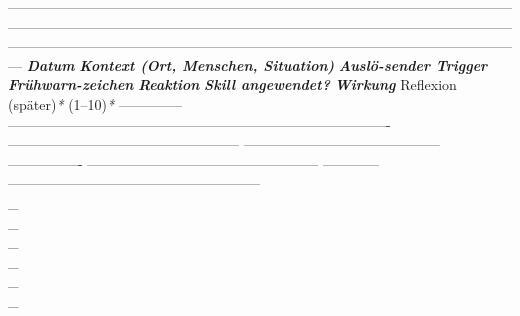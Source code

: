 {{---------------------------------------------------------------------------------------------------------------------------------------------------------------------------------------------------------------------------------------------------------------------------------------------------------------------------------------
\textbf{\textit{Datum}}    \textbf{\textit{Kontext (Ort, Menschen, Situation)}}                                           \textbf{\textit{Auslö-sender \textcolor{ctmmRed}{Trigger}}}                         \textbf{\textit{Frühwarn-zeichen}}                     \textbf{\textit{Reaktion}}   \textbf{\textit{Skill angewendet?}}                            \textbf{\textit{Wirkung   }}Reflexion (später)\textit{*}
(1--10)\textit{*}
-------------- ---------------------------------------------------------------------------------- -------------------------------------------------- ------------------------------------------ ---------------- -------------------------------------------------- ------------ ------------------------------------------------------
\textcolor{ctmmBlue}{}             \textcolor{ctmmBlue}{}                                                                                 \textcolor{ctmmBlue}{}                                                 \textcolor{ctmmBlue}{}                                         \textcolor{ctmmBlue}{} \\\_\\\_\\\_\\\_\\\_\\\_  \textcolor{ctmmBlue}{}                                                 \textcolor{ctmmBlue}{}           \textcolor{ctmmBlue}{}
}}
